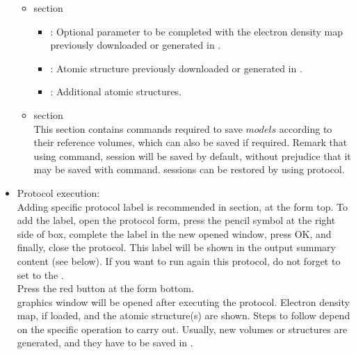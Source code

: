 \begin{itemize}
    \begin{itemize}
     \item {} section\\

    \begin{itemize}
     \item {}: Optional parameter to be completed with the electron density map previously downloaded or generated in \scipion.\\
     \item {}: Atomic structure previously downloaded or generated in \scipion.\\
     \item {}: Additional atomic structures.\\
    \end{itemize}
    \item {} section\\
    
    This section contains \chimera commands required to save $models$ according to their reference volumes, which can also be saved if required. Remark that using  command, \chimera session will be saved by default, without prejudice that it may be saved with  command. \chimera sessions can be restored by using  protocol.\\
    
    \end{itemize}

  \item Protocol execution:\\
  
  Adding specific protocol label is recommended in  section, at the form top. To add the label, open the protocol form, press the pencil symbol at the right side of  box, complete the label in the new opened window, press OK, and finally, close the protocol. This label will be shown in the output summary content (see below). If you want to run again this protocol, do not forget to set to  the .\\
  Press the  red button at the form bottom.\\
  
  \chimera graphics window will be opened after executing the protocol. Electron density map, if loaded, and the atomic structure(s) are shown. Steps to follow depend on the specific operation to carry out. Usually, new volumes or structures are generated, and they have to be saved in \scipion.\\
  \begin{itemize}
   

\end{itemize}
\end{itemize}
